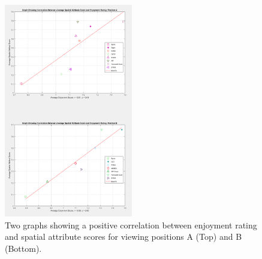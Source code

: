 	\begin{figure}
		\includegraphics[width=0.5\textwidth]{images/stats/enjoyment_corr_V1.PNG}
		\caption{Two graphs showing a positive correlation between enjoyment rating and spatial attribute scores for viewing positions A (Top) and B (Bottom).}
		\label{image:enjoyment} 
	\end{figure}		
